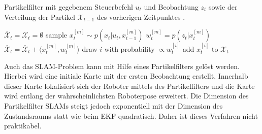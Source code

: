\begin{algorithm}
	\caption{Partikelfilter mit gegebenem Steuerbefehl $ u_t $ und Beobachtung $ z_t $ sowie der Verteilung der Partikel $ \mathcal{X}_{t-1} $ des vorherigen Zeitpunktes \cite{Stachniss2016}.}
	\label{Partikel}
	\begin{algorithmic}[1]
			\State $ \overline{\mathcal{X}}_t = \mathcal{X}_t = \emptyset $
				\State sample $ x_t^{[m]} \sim p(x_t \vert u_t,x_{t-1}^{[m]}) $										
				\State $ w_t^{[m]} = p(z_t \vert x_t^{[m]}) $
				\State $ \overline{\mathcal{X}}_t = \overline{\mathcal{X}}_t + \langle x_t^{[m]},w_t^{[m]} \rangle $ 
			\EndFor
				\State draw $ i $  with probability $ \propto w_t^{[i]} $
				\State add $ x_t^{[i]} $ to $ \mathcal{X}_t $
			\EndFor
			\State {}
		\EndFunction
	\end{algorithmic}
\end{algorithm}


Auch das SLAM-Problem kann mit Hilfe eines Partikelfilters gelöst werden. Hierbei wird eine initiale Karte mit der ersten Beobachtung erstellt. Innerhalb dieser Karte lokalisiert sich der Roboter mittels des Partikelfilters und die Karte wird entlang der wahrscheinlichsten Roboterpose erweitert. Die Dimension des Partikelfilter SLAMs steigt jedoch exponentiell mit der Dimension des Zustandsraums statt wie beim EKF quadratisch. Daher ist dieses Verfahren nicht praktikabel.  

